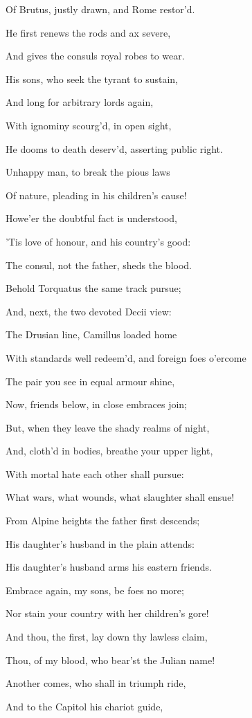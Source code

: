 Of Brutus, justly drawn, and Rome restor’d.

He first renews the rods and ax severe,

And gives the consuls royal robes to wear.

His sons, who seek the tyrant to sustain,

And long for arbitrary lords again,

With ignominy scourg’d, in open sight,

He dooms to death deserv’d, asserting public right.

Unhappy man, to break the pious laws

Of nature, pleading in his children’s cause!

Howe’er the doubtful fact is understood,

’Tis love of honour, and his country’s good:

The consul, not the father, sheds the blood.

Behold Torquatus the same track pursue;

And, next, the two devoted Decii view:

The Drusian line, Camillus loaded home

With standards well redeem’d, and foreign foes o’ercome

The pair you see in equal armour shine,

Now, friends below, in close embraces join;

But, when they leave the shady realms of night,

And, cloth’d in bodies, breathe your upper light,

With mortal hate each other shall pursue:

What wars, what wounds, what slaughter shall ensue!

From Alpine heights the father first descends;

His daughter’s husband in the plain attends:

His daughter’s husband arms his eastern friends.

Embrace again, my sons, be foes no more;

Nor stain your country with her children’s gore!

And thou, the first, lay down thy lawless claim,

Thou, of my blood, who bear’st the Julian name!

Another comes, who shall in triumph ride,

And to the Capitol his chariot guide,

